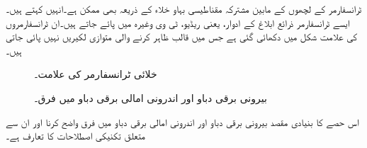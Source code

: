 ٹرانسفارمر کے لچھوں کے مابین مشترکہ مقناطیسی بہاو خلاء کے ذریعہ بھی ممکن ہے۔انہیں   کہتے ہیں۔ ایسے ٹرانسفارمر ذرائع ابلاغ کے ادوار، یعنی ریڈیو، ٹی وی وغیرہ میں پائے جاتے ہیں۔ان ٹرانسفارمروں کی علامت  شکل  میں دکھائی گئی ہے  جس میں  قالب ظاہر کرنے والی متوازی لکیریں نہیں پائی جاتی ہیں۔
\begin{figure}
\centering
\begin{minipage}{0.30\textwidth}
\centering
{}
\caption{خلائی ٹرانسفارمر کی علامت۔}
\label{شکل_ٹرانسفارمر_خلائی_قالب_علامت}
\end{minipage}%
\begin{minipage}{0.60\textwidth}
\centering
\caption{بیرونی برقی دباو اور اندرونی امالی برقی دباو میں فرق۔}
\label{شکل_ٹرانسفارمر_بیرونی_اور_اندرونی_برقی_دباو}
\end{minipage}
\end{figure}


اس حصے کا بنیادی مقصد بیرونی برقی دباو   اور اندرونی امالی برقی دباو   میں فرق واضح کرنا اور ان سے متعلق  تکنیکی اصطلاحات کا تعارف  ہے۔

